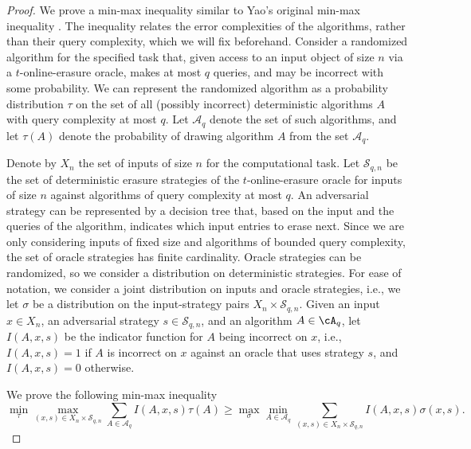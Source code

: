 \documentclass[11pt]{article}
\numberwithin{equation}{section}
\theoremstyle{definition}
\theoremstyle{plain}
\begin{document}
	\begin{proof} %
		
		
		We prove a min-max inequality similar to Yao's original min-max inequality \cite{Yao77}. The inequality relates the error complexities of the algorithms, rather than their query complexity, which we will fix beforehand. 
		Consider a randomized algorithm for the specified task
  that, given access to an input object of size $n$
  via a $t$-online-erasure oracle, makes at most $q$ queries, and may be incorrect with some probability. We can represent the randomized algorithm as a probability distribution $\tau$ on the set of all (possibly incorrect) deterministic algorithms $A$ with query complexity at most $q$. Let $\mathcal{A}_q$ denote the set of such algorithms, and let $\tau(A)$ denote the probability of drawing algorithm $A$ from the set $\mathcal{A}_q$. 
		
		Denote by $X_n$ the set of inputs of size $n$ for the computational task.
		Let $\mathcal{S}_{q,n}$ be the set of deterministic erasure strategies of the $t$-online-erasure oracle for inputs of size $n$ against algorithms of query complexity at most $q$. An adversarial strategy can be represented by a decision tree that, based on the input and the queries of the algorithm, indicates which input entries to erase next. Since we are only considering inputs of fixed size and algorithms of bounded query complexity, the set of oracle strategies has finite cardinality.
		Oracle strategies can be randomized, so we consider a distribution on deterministic strategies. For ease of notation, we consider a joint distribution on inputs and oracle strategies, i.e., we  let $\sigma$ be a distribution on the input-strategy pairs $X_n \times \mathcal{S}_{q,n}$. Given an input $x \in X_n$, an adversarial strategy $s \in \mathcal{S}_{q,n}$, and an algorithm $A \in \cA_q$,
		let $I(A,x, s)$ be the indicator function for $A$ being incorrect on $x$, i.e., $I(A,x,s) = 1$ if $A$ is incorrect on $x$ against an oracle that uses strategy $s$, and $I(A,x,s) = 0$ otherwise. 
		
		We 
  prove
  the following min-max inequality
		\begin{equation}
		\min_\tau \max_{(x, s) \in X_n \times \mathcal{S}_{q,n}} \sum_{A \in \mathcal{A}_q} I(A,x,s)\tau(A)  \geq \max_\sigma \min_{A \in \mathcal{A}_q}\sum_{(x, s) \in X_n \times \mathcal{S}_{q,n}} I(A,x,s)\sigma(x,s).
		\label{eq:yao_error}
		\end{equation}
		

\end{proof}
\end{document}
